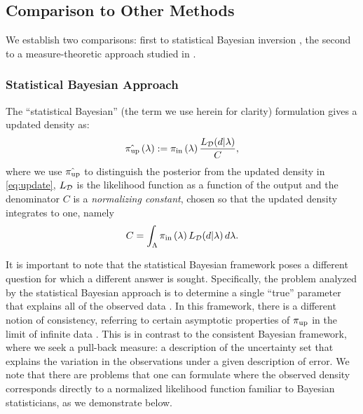 
\subsection{Comparison to Other Methods}\label{sec:othermethods}
We establish two comparisons: first to statistical Bayesian inversion \cite{Walpole, Berger, Complete}, the second to a measure-theoretic approach studied in \cite{BET+14}. 


\subsubsection{Statistical Bayesian Approach}


The ``statistical Bayesian'' (the term we use herein for clarity) formulation gives a updated density as:
\begin{equation}\label{eq:sb_post}
    \hat{\operatorname*{\pi_{up}}}\left ( \lambda \right ) := \operatorname*{\pi_{in}}\left ( \lambda \right ) \frac{L_{\mathcal{D}} (d | \lambda)}{ C },
\end{equation}
where we use $\hat{\operatorname*{\pi_{up}}}$ to distinguish the posterior from the updated density in \eqref{eq:update}, $L_{\mathcal{D}}$ is the likelihood function as a function of the output and the denominator $C$ is a \emph{normalizing constant}, chosen so that the updated density integrates to one, namely
\[
C = \int_{\Lambda} \operatorname*{\pi_{in}}\left ( \lambda \right ) L_{\mathcal{D}}(d | \lambda) \, d\lambda.
\]

It is important to note that the statistical Bayesian framework poses a different question for which a different answer is sought. 
Specifically, the problem analyzed by the statistical Bayesian approach is to determine a single ``true'' parameter that explains all of the observed data \cite{Smith, Concrete, Complete}.
In this framework, there is a different notion of consistency, referring to certain asymptotic properties of $\operatorname*{\pi_{up}}$ in the limit of infinite data \cite{Barron, Silverman}.
This is in contrast to the consistent Bayesian framework, where we seek a pull-back measure: a description of the uncertainty set that explains the variation in the observations under a given description of error.
We note that there are problems that one can formulate where the observed density corresponds directly to a normalized likelihood function familiar to Bayesian statisticians, as we demonstrate below. 


